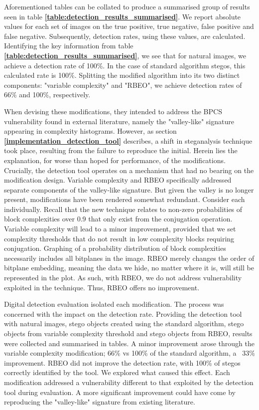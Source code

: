 \documentclass{l4proj}
\begin{document}
Aforementioned tables can be collated to produce a summarised group of results seen in table \textbf{\ref{table:detection_results_summarised}}. 
We report absolute values for each set of images on the true positive, true negative, false positive and false negative. Subsequently, detection rates, using these values, are calculated. Identifying the key information from table \textbf{\ref{table:detection_results_summarised}}, we see that for natural images, we achieve a detection rate of 100\%. In the case of standard algorithm stegos, this calculated rate is 100\%. Splitting the modified algorithm into its two distinct components: "variable complexity" and "RBEO", we achieve detection rates of 66\% and 100\%, respectively. 

When devising these modifications, they intended to address the BPCS vulnerability found in external literature, namely the "valley-like" signature appearing in complexity histograms. However, as section \textbf{\ref{implementation_detection_tool}} describes, a shift in steganalysis technique took place, resulting from the failure to reproduce the initial. Herein lies the explanation, for worse than hoped for performance, of the modifications. Crucially, the detection tool operates on a mechanism that had no bearing on the modification design. Variable complexity and RBEO specifically addressed separate components of the valley-like signature. But given the valley is no longer present, modifications have been rendered somewhat redundant. Consider each individually. Recall that the new technique relates to non-zero probabilities of block complexities over 0.9 that only exist from the conjugation operation. Variable complexity will lead to a minor improvement, provided that we set complexity thresholds that do not result in low complexity blocks requiring conjugation. Graphing of a probability distribution of block complexities necessarily includes all bitplanes in the image. RBEO merely changes the order of bitplane embedding, meaning the data we hide, no matter where it is, will still be represented in the plot. As such, with RBEO, we do not address vulnerability exploited in the technique. Thus, RBEO offers no improvement.

Digital detection evaluation isolated each modification. The process was concerned with the impact on the detection rate. Providing the detection tool with natural images, stego objects created using the standard algorithm, stego objects from variable complexity threshold and stego objects from RBEO, results were collected and summarised in tables. A minor improvement arose through the variable complexity modification; 66\% vs 100\% of the standard algorithm, a ~33\% improvement. RBEO did not improve the detection rate, with 100\% of stegos correctly identified by the tool.  We explored what caused this effect. Each modification addressed a vulnerability different to that exploited by the detection tool during evaluation. A more significant improvement could have come by reproducing the "valley-like" signature from existing literature.
\end{document}
